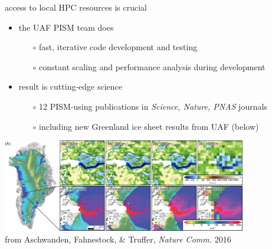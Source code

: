 \documentclass[hide notes,intlimits]{beamer}
\begin{document}
\begin{frame}{access to local HPC resources is crucial}

    \begin{itemize}
    \item the UAF PISM team does
       \begin{itemize}
       \item[$\circ$] fast, iterative code development and testing
       \item[$\circ$] constant scaling and performance analysis during development
       \end{itemize}    
    \item result is cutting-edge science
       \begin{itemize}
       \item[$\circ$] 12 PISM-using publications in \emph{Science, Nature, PNAS} journals
       \item[$\circ$] including new Greenland ice sheet results from UAF (below)
       \end{itemize}
    \end{itemize}

\begin{center}
    \includegraphics[width=0.8\textwidth]{jakobshavn-beds}
    \\ \hfill \scriptsize from Aschwanden, Fahnestock, \& Truffer, \emph{Nature Comm.} 2016
\end{center}
\end{frame}



\end{document}
